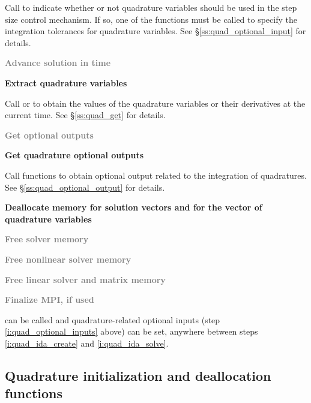 {\begin{Steps}
  Call  to indicate whether or not quadrature variables
  should be used in the step size control mechanism. If so, one of the
   functions  must be called to specify the integration
  tolerances for quadrature variables.
  See \S\ref{ss:quad_optional_input} for details.

\item\label{i:quad_ida_solve}
  \textcolor{gray}{\bf Advance solution in time}

\item
  {\bf Extract quadrature variables}

  Call  or  to obtain the values of the quadrature
  variables or their derivatives at the current time. See \S\ref{ss:quad_get} for details.

\item
  \textcolor{gray}{\bf Get optional outputs}

\item
  {\bf Get quadrature optional outputs}

  Call  functions to obtain optional output related to
  the integration of quadratures.
  See \S\ref{ss:quad_optional_output} for details.

\item
  {\bf Deallocate memory for solution vectors and for the vector of quadrature variables}

\item
  \textcolor{gray}{\bf Free solver memory}

\item
  \textcolor{gray}{\bf Free nonlinear solver memory}

\item
  \textcolor{gray}{\bf Free linear solver and matrix memory}

\item
  \textcolor{gray}{\bf Finalize MPI, if used}

\end{Steps}
 can be called and quadrature-related optional inputs
(step \ref{i:quad_optional_inputs} above) can be set, anywhere between steps
\ref{i:quad_ida_create} and \ref{i:quad_ida_solve}.


\subsection{Quadrature initialization and deallocation functions}\label{ss:quad_init}

}
